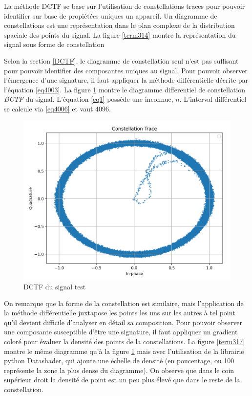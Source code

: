 La méthode DCTF se base sur l'utilisation de constellations traces pour pouvoir identifier sur base de propiétées uniques un appareil. Un diagramme de constellations est une représentation dans le plan complexe de la distribution spaciale des points du signal. La figure \ref{term314} montre la représentation  du signal sous forme de constellation

\vspace{0.1cm}

Selon la section \ref{DCTF}, le diagramme de constellation seul n'est pas suffisant pour pouvoir identifier des composantes uniques au signal. Pour pouvoir observer l'émergence d'une signature, il faut appliquer la méthode différentielle décrite par l'équation \ref{eq4003}. La figure \ref{term316} montre le diagramme differentiel de constellation \textit{DCTF} du signal. L'équation \ref{eq1} possède une inconnue, $n$. L'interval différentiel se calcule via \ref{eq4006} et vaut 4096.

\begin{figure}[h]
\centering

\includegraphics[scale=0.25]{images/dctf3.png}
\caption{DCTF du signal test}\label{term316}
\end{figure}

On remarque que la forme de la constellation est similaire, mais l'application de la méthode différentielle juxtapose les points les uns sur les autres à tel point qu'il devient difficile d'analyser en détail sa composition. Pour pouvoir observer une composante susceptible d'être une signature, il faut appliquer un gradient coloré pour évaluer la densité des points de la constellations. La figure \ref{term317} montre le même diagramme qu'à la figure \ref{term316} mais avec l'utilisation de la librairie python Datashader, qui ajoute une échelle de densité (en poucentage, ou 100 représente la zone la plus dense du diagramme). On observe que dans le coin supérieur droit la densité de point est un peu plus élevé que dans le reste de la constellation.

